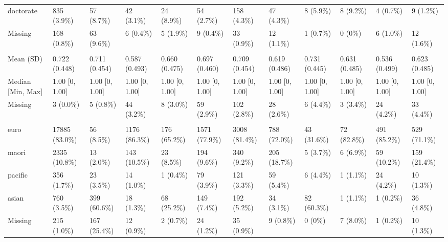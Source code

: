 \documentclass[
  single column]{article}
\begin{document}
\begin{landscape}
\begin{longtable}[t]{llllllllllll}
\hspace{1em}doctorate & 835 (3.9\%) & 57 (8.7\%) & 42 (3.1\%) & 24 (8.9\%) & 54 (2.7\%) & 158 (4.3\%) & 47 (4.3\%) & 8 (5.9\%) & 8 (9.2\%) & 4 (0.7\%) & 9 (1.2\%)\\
\hspace{1em}Missing & 168 (0.8\%) & 63 (9.6\%) & 6 (0.4\%) & 5 (1.9\%) & 9 (0.4\%) & 33 (0.9\%) & 12 (1.1\%) & 1 (0.7\%) & 0 (0\%) & 6 (1.0\%) & 12 (1.6\%)\\
\addlinespace[0.3em]
\multicolumn{12}{l}{\textbf{Employment Status (Employed/Unemployed)}}\\
\hspace{1em}Mean (SD) & 0.722 (0.448) & 0.711 (0.454) & 0.587 (0.493) & 0.660 (0.475) & 0.697 (0.460) & 0.709 (0.454) & 0.619 (0.486) & 0.731 (0.445) & 0.631 (0.485) & 0.536 (0.499) & 0.623 (0.485)\\
\hspace{1em}Median [Min, Max] & 1.00 [0, 1.00] & 1.00 [0, 1.00] & 1.00 [0, 1.00] & 1.00 [0, 1.00] & 1.00 [0, 1.00] & 1.00 [0, 1.00] & 1.00 [0, 1.00] & 1.00 [0, 1.00] & 1.00 [0, 1.00] & 1.00 [0, 1.00] & 1.00 [0, \vphantom{1} 1.00]\\
\hspace{1em}Missing & 3 (0.0\%) & 5 (0.8\%) & 44 (3.2\%) & 8 (3.0\%) & 59 (2.9\%) & 102 (2.8\%) & 28 (2.6\%) & 6 (4.4\%) & 3 (3.4\%) & 24 (4.2\%) & 33 (4.4\%)\\
\addlinespace[0.3em]
\multicolumn{12}{l}{\textbf{Ethnicity Category}}\\
\hspace{1em}euro & 17885 (83.0\%) & 56 (8.5\%) & 1176 (86.3\%) & 176 (65.2\%) & 1571 (77.9\%) & 3008 (81.4\%) & 788 (72.0\%) & 43 (31.6\%) & 72 (82.8\%) & 491 (85.2\%) & 529 (71.1\%)\\
\hspace{1em}maori & 2335 (10.8\%) & 13 (2.0\%) & 143 (10.5\%) & 23 (8.5\%) & 194 (9.6\%) & 340 (9.2\%) & 205 (18.7\%) & 5 (3.7\%) & 6 (6.9\%) & 59 (10.2\%) & 159 (21.4\%)\\
\hspace{1em}pacific & 356 (1.7\%) & 23 (3.5\%) & 14 (1.0\%) & 1 (0.4\%) & 79 (3.9\%) & 121 (3.3\%) & 59 (5.4\%) & 6 (4.4\%) & 1 (1.1\%) & 24 (4.2\%) & 10 (1.3\%)\\
\hspace{1em}asian & 760 (3.5\%) & 399 (60.6\%) & 18 (1.3\%) & 68 (25.2\%) & 149 (7.4\%) & 192 (5.2\%) & 34 (3.1\%) & 82 (60.3\%) & 1 (1.1\%) & 1 (0.2\%) & 36 (4.8\%)\\
\hspace{1em}Missing & 215 (1.0\%) & 167 (25.4\%) & 12 (0.9\%) & 2 (0.7\%) & 24 (1.2\%) & 35 (0.9\%) & 9 (0.8\%) & 0 (0\%) & 7 (8.0\%) & 1 (0.2\%) & 10 (1.3\%)\\

\end{longtable}
\end{landscape}
\end{document}
